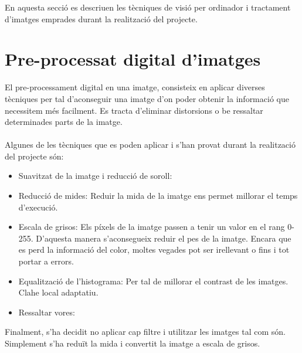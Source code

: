 En aquesta secció es descriuen les tècniques de visió per ordinador i tractament d'imatges emprades durant la realització del projecte.

\section{Pre-processat digital d'imatges}
	El pre-processament digital en una imatge, consisteix en aplicar diverses tècniques per tal d'aconseguir una imatge d'on poder obtenir la informació que necessitem més facilment. Es tracta
	d'eliminar distorsions o be ressaltar determinades parts de la imatge.\\\\
	Algunes de les tècniques que es poden aplicar i s'han provat durant la realització del projecte són:

	\begin{itemize}
		\item{Suavitzat de la imatge i reducció de soroll: }
		\item{Reducció de mides: Reduir la mida de la imatge ens permet millorar el temps d'execució.}
		\item{Escala de grisos: Els píxels de la imatge passen a tenir un valor en el rang 0-255. D'aquesta manera s'aconsegueix reduir el pes de la imatge. Encara que es perd la informació del color, moltes
		vegades pot ser irellevant o fins i tot portar a errors.}
		\item{Equalització de l'histograma: Per tal de millorar el contrast de les imatges. Clahe local adaptatiu.}
		\item{Ressaltar vores: }
	\end{itemize}

	Finalment, s'ha decidit no aplicar cap filtre i utilitzar les imatges tal com són. Simplement s'ha reduït la mida i convertit la imatge a escala de grisos.

\newpage
